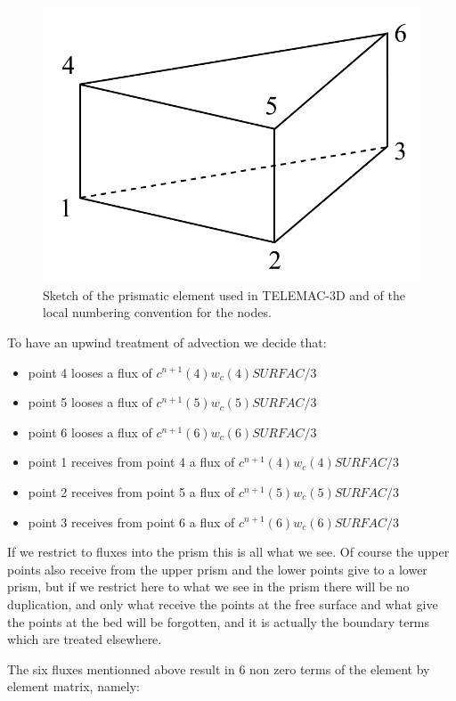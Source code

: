 \begin{figure}[h]%
\centering
\includegraphics[scale=0.5]{graphics/prism_numbering.pdf}
\caption{Sketch of the prismatic element used in TELEMAC-3D and of the local numbering convention for the nodes.}
\label{schema prisme}%
\end{figure}

To have an upwind treatment of advection we decide that:
\begin{itemize}
\item point 4 looses a flux of $c^{n+1}(4)w_{c}(4)SURFAC/3$
\item point 5 looses a flux of $c^{n+1}(5)w_{c}(5)SURFAC/3$
\item point 6 looses a flux of $c^{n+1}(6)w_{c}(6)SURFAC/3$
\item point 1 receives from point 4 a flux of $c^{n+1}(4)w_{c}(4)SURFAC/3$
\item point 2 receives from point 5 a flux of $c^{n+1}(5)w_{c}(5)SURFAC/3$
\item point 3 receives from point 6 a flux of $c^{n+1}(6)w_{c}(6)SURFAC/3$
\end{itemize}
If we restrict to fluxes into the prism this is all what we see. Of course the
upper points also receive from the upper prism and the lower points give to a
lower prism, but if we restrict here to what we see in the prism there will be
no duplication, and only what receive the points at the free surface and what
give the points at the bed will be forgotten, and it is actually the
boundary terms which are treated elsewhere.

The six fluxes mentionned above result in 6 non zero terms of the element by
element matrix, namely:

